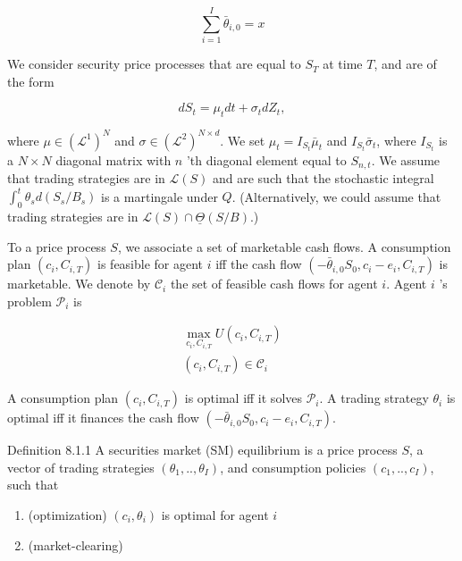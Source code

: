 \documentclass[\topdir/lecture\_notes.tex]{subfiles}
\begin{document}
\begin{equation}
\sum_{i=1}^{I} \bar{\theta}_{i, 0}=x
\end{equation}

We consider security price processes that are equal to $S_{T}$ at time $T$, and are of the form

\begin{equation}
d S_{t}=\mu_{t} d t+\sigma_{t} d Z_{t},
\end{equation}

where $\mu \in\left(\mathcal{L}^{1}\right)^{N}$ and $\sigma \in\left(\mathcal{L}^{2}\right)^{N \times d}$. We set $\mu_{t}=I_{S_{t}} \bar{\mu}_{t}$ and $I_{S_{t}} \bar{\sigma}_{t}$, where $I_{S_{t}}$ is a $N \times N$ diagonal matrix with $n$ 'th diagonal element equal to $S_{n, t}$. We assume that trading strategies are in $\mathcal{L}(S)$ and are such that the stochastic integral $\int_{0}^{t} \theta_{s} d\left(S_{s} / B_{s}\right)$ is a martingale under $Q$. (Alternatively, we could assume that trading strategies are in $\mathcal{L}(S) \cap \underline{\Theta}(S / B)$.)

To a price process $S$, we associate a set of marketable cash flows. A consumption plan $\left(c_{i}, C_{i, T}\right)$ is feasible for agent $i$ iff the cash flow $\left(-\bar{\theta}_{i, 0} S_{0}, c_{i}-e_{i}, C_{i, T}\right)$ is marketable. We denote by $\mathcal{C}_{i}$ the set of feasible cash flows for agent $i$. Agent $i$ 's problem $\mathcal{P}_{i}$ is

\begin{equation}
\begin{gathered}
\max _{c_{i}, C_{i, T}} U\left(c_{i}, C_{i, T}\right) \\
\left(c_{i}, C_{i, T}\right) \in \mathcal{C}_{i}
\end{gathered}
\end{equation}

A consumption plan $\left(c_{i}, C_{i, T}\right)$ is optimal iff it solves $\mathcal{P}_{i}$. A trading strategy $\theta_{i}$ is optimal iff it finances the cash flow $\left(-\bar{\theta}_{i, 0} S_{0}, c_{i}-e_{i}, C_{i, T}\right)$.

Definition 8.1.1 A securities market (SM) equilibrium is a price process $S$, a vector of trading strategies $\left(\theta_{1}, . ., \theta_{I}\right)$, and consumption policies $\left(c_{1}, . ., c_{I}\right)$, such that

\begin{enumerate}
  \item (optimization) $\left(c_{i}, \theta_{i}\right)$ is optimal for agent $i$

  \item (market-clearing)

\end{enumerate}
\end{document}
